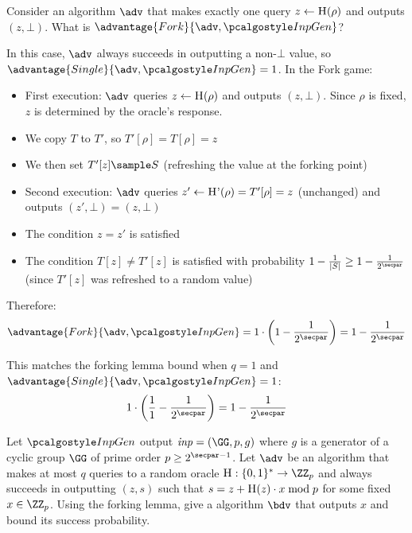 \begin{exercise}
  Consider an algorithm $\adv$ that makes exactly one query $z \gets {\normalfont\textsc{H}}(\rho)$ and outputs $(z, \bot)$. What is $\advantage{Fork}{\adv, \algo{InpGen}}$?
\end{exercise}

\ifsolutions
\begin{mysolution}
  In this case, $\adv$ always succeeds in outputting a non-$\bot$ value, so $\advantage{Single}{\adv, \algo{InpGen}} = 1$. In the Fork game:
  
  \begin{itemize}
    \item First execution: $\adv$ queries $z \gets {\normalfont\textsc{H}}(\rho)$ and outputs $(z, \bot)$. Since $\rho$ is fixed, $z$ is determined by the oracle's response.
    \item We copy $T$ to $T'$, so $T'[\rho] = T[\rho] = z$
    \item We then set $T'[z] \sample S$ (refreshing the value at the forking point)
    \item Second execution: $\adv$ queries $z' \gets {\normalfont\textsc{H'}}(\rho) = T'[\rho] = z$ (unchanged) and outputs $(z', \bot) = (z, \bot)$
    \item The condition $z = z'$ is satisfied
    \item The condition $T[z] \neq T'[z]$ is satisfied with probability $1 - \frac{1}{|S|} \geq 1 - \frac{1}{2^\secpar}$ (since $T'[z]$ was refreshed to a random value)
  \end{itemize}
  
  Therefore:
  \[
  \advantage{Fork}{\adv, \algo{InpGen}} = 1 \cdot \left(1 - \frac{1}{2^\secpar}\right) = 1 - \frac{1}{2^\secpar}
  \]
  
  This matches the forking lemma bound when $q = 1$ and $\advantage{Single}{\adv, \algo{InpGen}} = 1$:
  \[
  1 \cdot \left(\frac{1}{1} - \frac{1}{2^\secpar}\right) = 1 - \frac{1}{2^\secpar}
  \]
\end{mysolution}
\fi


\begin{exercise}
  Let $\algo{InpGen}$ output $\mathit{inp} = (\GG,p,g)$ where $g$ is a generator of a cyclic group $\GG$ of prime order $p \geq 2^{\secpar-1}$.
  Let $\adv$ be an algorithm that makes at most $q$ queries to a random oracle $\pcoracle{H}: \{0,1\}^* \rightarrow \ZZ_p$ and always succeeds in outputting $(z, s)$ such that $s = z + {\normalfont\textsc{H}}(z) \cdot x \bmod p$ for some fixed $x \in \ZZ_p$.
  Using the forking lemma, give a \ppt algorithm $\bdv$ that outputs $x$ and bound its success probability.
\end{exercise}

